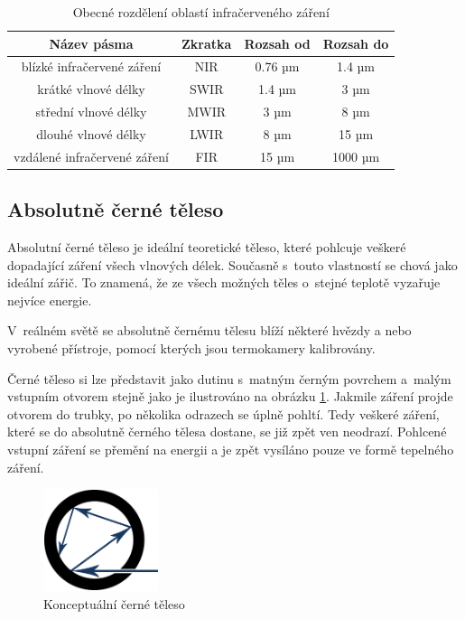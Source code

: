     \begin{table}[h]
      \centering
      \begin{tabular}{|c|c|c|c|}
        \hline
        \rowcolor{Blue}
        \color{White}\textbf{Název pásma} & \color{White}\textbf{Zkratka} & \color{White}\textbf{Rozsah od} & \color{White}\textbf{Rozsah do} \\ \hline
        blízké infračervené záření 	& NIR  		& 0.76 µm   & 1.4 µm   	    \\ \hline
        krátké vlnové délky   		& SWIR		& 1.4 µm 	& 3 µm		    \\ \hline
        střední vlnové délky 		& MWIR 		& 3	µm 		& 8 µm		    \\ \hline
        dlouhé vlnové délky  		& LWIR 		& 8 µm		& 15 µm		    \\ \hline
        vzdálené infračervené záření & FIR  	& 15 µm		& 1000 µm 	    \\ \hline
      \end{tabular}
      \caption{Obecné rozdělení oblastí infračerveného záření}
      \label{table:ir_regions_table_common}
    \end{table}
     
     \subsection{Absolutně černé těleso} \label{sec:absolute_black_body}
   	 Absolutní černé těleso  je ideální teoretické těleso, které pohlcuje veškeré dopadající záření všech vlnových délek. Současně s~touto vlastností se chová jako ideální zářič. To znamená, že ze všech možných těles o~stejné teplotě vyzařuje nejvíce energie. 
     
     V~reálném světě se absolutně černému tělesu blíží některé hvězdy a nebo vyrobené přístroje, pomocí kterých  jsou termokamery kalibrovány. \cite{kadleckzadkladymereni1, jakl2011experimentalni}
    
    Černé těleso si lze představit jako dutinu s~matným černým povrchem a~malým vstupním otvorem stejně jako je ilustrováno na obrázku \ref{fig:black_body_image}. Jakmile záření projde otvorem do trubky, po několika odrazech se úplně pohltí. Tedy veškeré záření, které se do absolutně černého tělesa dostane, se již zpět ven neodrazí. Pohlcené vstupní záření se přemění na energii a je zpět vysíláno pouze ve formě tepelného záření.
   
    \begin{figure}[h]
      \centering
      \includegraphics[width=0.3\textwidth]{images/black_body.png}
      \caption{Konceptuální černé těleso}
      \label{fig:black_body_image}
    \end{figure}    
     
